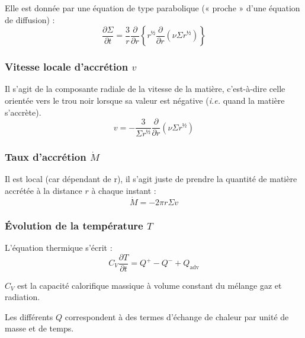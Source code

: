 Elle est donnée par une équation de type parabolique (« proche » d’une équation
de diffusion) :
\begin{equation}
    \label{eq:densite_surface}
    \frac{\partial \Sigma}{\partial t} = \frac{\num{3}}{r} \frac{\partial}{\partial r} \left\{ r^½ \frac{\partial}{\partial r} \left(\nu \Sigma r^½ \right) \right\}
\end{equation}

\subsubsection{\texorpdfstring{Vitesse locale d’accrétion $v$}{Vitesse locale d’accrétion v}}

Il s’agit de la composante radiale de la vitesse de la matière, c’est-à-dire
celle orientée vers le trou noir lorsque sa valeur est négative (\textit{i.e.}
quand la matière s’accrète).
\begin{equation}
    \label{eq:vitesse_accretion}
    v = - \frac{\num{3}}{\Sigma r^½} \frac{\partial}{\partial r} \left( \nu \Sigma r^½ \right)
\end{equation}

\subsubsection{\texorpdfstring{Taux d’accrétion $\dot{M}$}{Taux d’accrétion dM/dt}}

Il est local (car dépendant de r), il s’agit juste de prendre la quantité de
matière accrétée à la distance $r$ à chaque instant :
\begin{equation}
    \label{eq:taux_accretion}
    \dot{M} = - \num{2} \pi r \Sigma v
\end{equation}

\subsubsection{\texorpdfstring{Évolution de la température $T$}{Évolution de la température \textit{T}}}

L’équation thermique s’écrit :
\begin{equation}
    \label{eq:equation_thermique_th}
    C_V \frac{\partial T}{\partial t} = Q^+ - Q^- + Q_\mathrm{adv}
\end{equation}

$C_V$ est la capacité calorifique massique à volume constant du mélange gaz et
radiation.

Les différents $Q$ correspondent à des termes d’échange de chaleur par unité de
masse et de temps.

